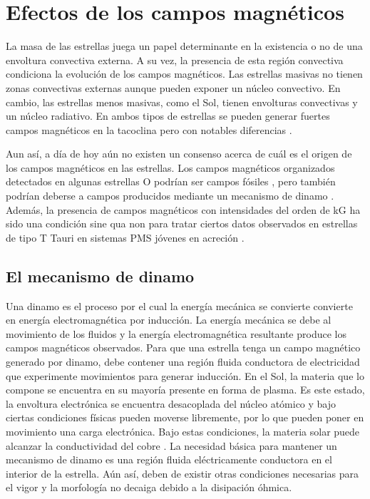 \section{Efectos de los campos magnéticos}
La masa de las estrellas juega un papel determinante en la existencia o no de una envoltura convectiva externa. A su vez, la presencia de esta región convectiva condiciona la evolución de los campos magnéticos. Las estrellas masivas no tienen zonas convectivas externas aunque pueden exponer un núcleo convectivo. En cambio, las estrellas menos masivas, como el Sol, tienen envolturas convectivas y un núcleo radiativo. En ambos tipos de estrellas se pueden generar fuertes campos magnéticos en la tacoclina pero con notables diferencias \citep[v.g.][para más detalles]{Chabrier2006,Charbonneau2010}.\par

Aun así, a día de hoy aún no existen un consenso acerca de cuál es el origen de los campos magnéticos en las estrellas. Los campos magnéticos organizados detectados en algunas estrellas O \citep{Wade2010} podrían ser campos fósiles \citep[ver][para más detalles ]{Dudorov2014}, pero también podrían deberse a campos producidos mediante un mecanismo de dinamo \citep{Cantiello2009}. Además, la presencia de campos magnéticos con intensidades del orden de kG \citep{Hussain2014} ha sido una condición sine qua non para tratar ciertos datos observados en estrellas de tipo T Tauri en sistemas PMS jóvenes en acreción \citep{Johns-Krull2007}.\par

\subsection{El mecanismo de dinamo}
Una dinamo es el proceso por el cual la energía mecánica se convierte
convierte en energía electromagnética por inducción. La energía mecánica se debe al movimiento de los fluidos y la energía electromagnética resultante produce los campos magnéticos observados. Para que una estrella tenga un campo magnético generado por dinamo, debe contener una región fluida conductora de electricidad que experimente movimientos para generar inducción. En el Sol, la materia que lo compone se encuentra en su mayoría presente en forma de plasma. Es este estado, la envoltura electrónica se encuentra desacoplada del núcleo atómico y bajo ciertas condiciones físicas pueden moverse libremente, por lo que pueden poner en movimiento una carga electrónica. Bajo estas condiciones, la materia solar puede alcanzar la conductividad del cobre \citep{Banisch2009}. La necesidad básica para mantener un mecanismo de dinamo es una región fluida eléctricamente conductora en el interior de la estrella. Aún así, deben de existir otras condiciones necesarias para el vigor y la morfología no decaiga debido a la disipación óhmica. 
\par


